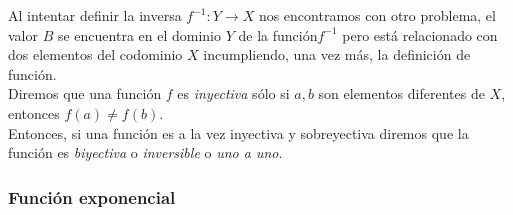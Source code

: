 \documentclass[Análisis.root.tex]{subfiles}
\begin{document}
        Al intentar definir la inversa \(f^{−1}: Y\rightarrow X\) nos encontramos con otro problema, el valor \(B\) se encuentra en el dominio \(Y\) de la función\(f^{−1}\) pero está relacionado con dos elementos del codominio \(X\) incumpliendo, una vez más, la definición de función.\\
        Diremos que una función \(f\) es \textit{inyectiva} sólo si \(a,b\) son elementos diferentes de \(X\), entonces \(f(a)\neq f(b)\).\\
        Entonces, si una función es a la vez inyectiva y sobreyectiva diremos que la función es \textit{biyectiva} o \textit{inversible} o \textit{uno a uno}.
        \subsubsection{Función exponencial}
\end{document}

